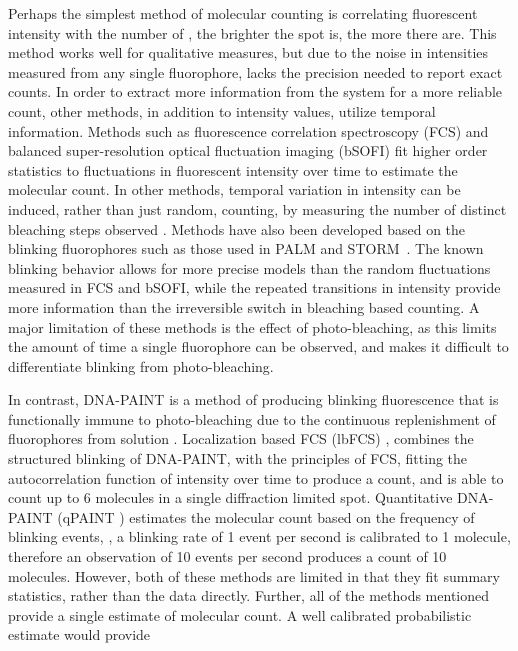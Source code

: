 Perhaps the simplest method of molecular counting is correlating fluorescent
  intensity with the number of \smallobjects \cite{schmied_2012, tolar_2005}, \ie the brighter the spot is, the more there are.
  This method works well for qualitative measures, but due to the noise in intensities 
  measured from any single fluorophore, lacks the precision needed to report exact counts.
  In order to extract more information from the system for a more reliable count, other methods, 
  in addition to intensity values, utilize temporal information.
  Methods such as fluorescence correlation spectroscopy (FCS) \cite{otsuka_2023, wachsmuth_2015, politi_2018} and 
  balanced super-resolution optical fluctuation imaging (bSOFI) \cite{geissbuehler_2012}
  fit higher order statistics to fluctuations in fluorescent intensity over time to estimate the molecular count.
  In other methods, temporal variation in intensity can be induced, rather than just random, \ie
  counting, by measuring the number of distinct bleaching steps observed \cite{ulbrich_2007, jain_2011}.
  Methods have also been developed based on the blinking fluorophores \cite{rollins_stochastic_2015, nino_2017} 
  such as those used in PALM \cite{sengupta_pcPALM_2011, lee_counting_2012} and STORM~\cite{patel_blinking_2021}. 
  The known blinking behavior allows for more precise models than the random fluctuations measured in FCS and bSOFI, while the 
  repeated transitions in intensity provide more information than the irreversible switch in bleaching based counting.
  A major limitation of these methods is the effect of photo-bleaching, as this limits the amount of time
  a single fluorophore can be observed, and makes it difficult to differentiate blinking from photo-bleaching.


In contrast, DNA-PAINT \cite{schnitzbauer_2017} is a method of producing blinking fluorescence that is functionally
    immune to photo-bleaching due to the continuous replenishment of fluorophores from solution \cite{stehr_2021}.
    Localization based FCS (lbFCS) \cite{stein_2021}, combines the structured blinking of DNA-PAINT, with the 
    principles of FCS, fitting the autocorrelation function of intensity over time to produce a count,
    and is able to count up to 6 molecules in a single diffraction limited spot.
    Quantitative DNA-PAINT (qPAINT \cite{jungmann_2016}) estimates the molecular count based on the frequency of blinking events, \ie, 
    a blinking rate of 1 event per second is calibrated to 1 molecule, therefore an observation of 10 events per second
    produces a count of 10 molecules.
    However, both of these methods are limited in that they fit summary statistics,
    rather than the data directly. 
    Further, all of the methods mentioned provide a single estimate of molecular count.
    A well calibrated probabilistic estimate would provide 
    
